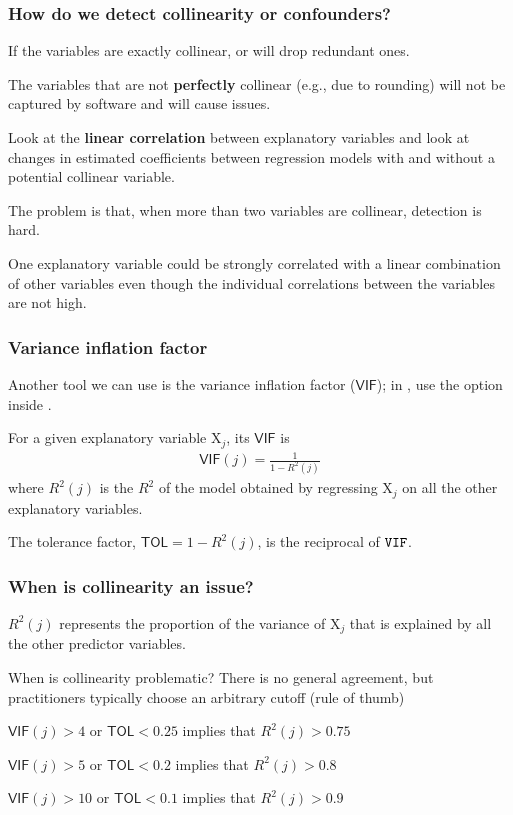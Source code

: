 \documentclass{beamer}
\begin{document}
\begin{frame}[fragile]
\frametitle{How do we detect collinearity or confounders?}
\bi
\item If the variables are exactly collinear, \SASlang or \Rlang will drop redundant ones.
\bi 
\item The variables that are not \textbf{perfectly} collinear (e.g., due to rounding) will not be captured by software and will cause issues.
\ei
\item Look at the \textbf{linear correlation} between \alert{explanatory variables} and look at changes in estimated coefficients between regression models with and without a potential collinear variable.
\item The problem is that, when more than two variables are collinear, detection is hard.
\item One explanatory variable could be strongly correlated with a linear combination of other variables even though the individual correlations between the variables are not high. 
\ei
\end{frame}

\begin{frame}
\frametitle{Variance inflation factor}
\bi
\item Another tool we can use is the variance inflation factor ($\mathsf{VIF}$); in \SASlang, use the option  inside .
\item For a given explanatory variable $\mathrm{X}_j$, its $\mathsf{VIF}$ is
\begin{align*}
\mathsf{VIF}(j)=\frac{1}{1-R^2(j)}
\end{align*}
where $R^2(j)$ is the $R^2$ of the model obtained by regressing $\mathrm{X}_j$ on all the other explanatory variables.
 \item The tolerance factor, $\mathsf{TOL}=1-R^2(j)$, is the reciprocal of $\texttt{VIF}$.
\ei
\end{frame}
\begin{frame}
\frametitle{When is collinearity an issue?}
\bi
\item $R^2(j)$ represents the proportion of the variance of $\mathrm{X}_j$ that is explained by all the other predictor variables.
\item When is collinearity problematic? There is no general agreement, but practitioners typically choose an arbitrary cutoff (rule of thumb)
\bi 
\item $\mathsf{VIF}(j) > 4$ or $\mathsf{TOL} < 0.25$ implies that $R^2(j) >0.75$
\item $\mathsf{VIF}(j) > 5$ or $\mathsf{TOL} < 0.2$ implies that $R^2(j) >0.8$
\item $\mathsf{VIF}(j) > 10$ or $\mathsf{TOL} < 0.1$  implies that $R^2(j) >0.9$
\ei
\ei
\end{frame}
\end{document}
